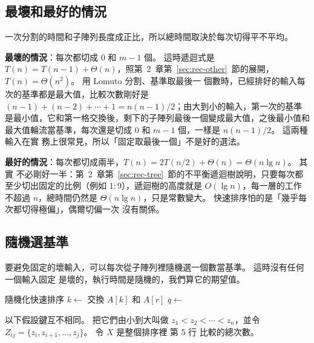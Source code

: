 \subsection{最壞和最好的情況}

一次分割的時間和子陣列長度成正比，所以總時間取決於每次切得平不平均。

\textbf{最壞的情況}：每次都切成 $0$ 和 $m - 1$ 個。 這時遞迴式是 $T(n) = T(n-1) +
\Theta(n)$，照第~2~章第~\ref{sec:rec-other}~節的展開，$T(n) = \Theta(n^2)$。 用 Lomuto 分割、基準取最後一
個數時，已經排好的輸入每次的基準都是最大值，比較次數剛好是 $(n-1) + (n-2) + \cdots +
1 = n(n-1)/2$；由大到小的輸入，第一次的基準是最小值，它和第一格交換後，剩下的子陣列最後一個變成最大值，之後最小值和最大值輪流當基準，每次還是切成 $0$ 和 $m - 1$ 個，一樣是 $n(n-1)/2$。 這兩種輸入在實
務上很常見，所以「固定取最後一個」不是好的選法。

\textbf{最好的情況}：每次都切成兩半，$T(n) = 2T(n/2) + \Theta(n) = \Theta(n \lg n)$。 其實
不必剛好一半：第~2~章第~\ref{sec:rec-tree}~節的不平衡遞迴樹說明，只要每次都至少切出固定的比例（例如
$1:9$），遞迴樹的高度就是 $O(\lg n)$，每一層的工作不超過 $n$，總時間仍然是
$\Theta(n \lg n)$，只是常數變大。 快速排序怕的是「幾乎每次都切得極偏」，偶爾切偏一次
沒有關係。

\subsection{隨機選基準}

要避免固定的壞輸入，可以每次從子陣列裡隨機選一個數當基準。 這時沒有任何一個輸入固定
是壞的，執行時間是隨機的，我們算它的期望值。

\begin{pseudo}[label=alg:so-rand]{隨機化快速排序}
    \State $k \gets$  
    \State 交換 $A[k]$ 和 $A[r]$
    \State \Return {}
\EndFunction
\Statex
{}
        \State $q \gets$ 
        \State {}
        \State {}
    \EndIf
\EndProcedure
\end{pseudo}

以下假設鍵互不相同。 把它們由小到大叫做 $z_1 < z_2 < \cdots < z_n$，並令
$Z_{ij} = \{z_i, z_{i+1}, \ldots, z_j\}$。 令 $X$ 是整個排序裡  第 5 行
比較的總次數。

